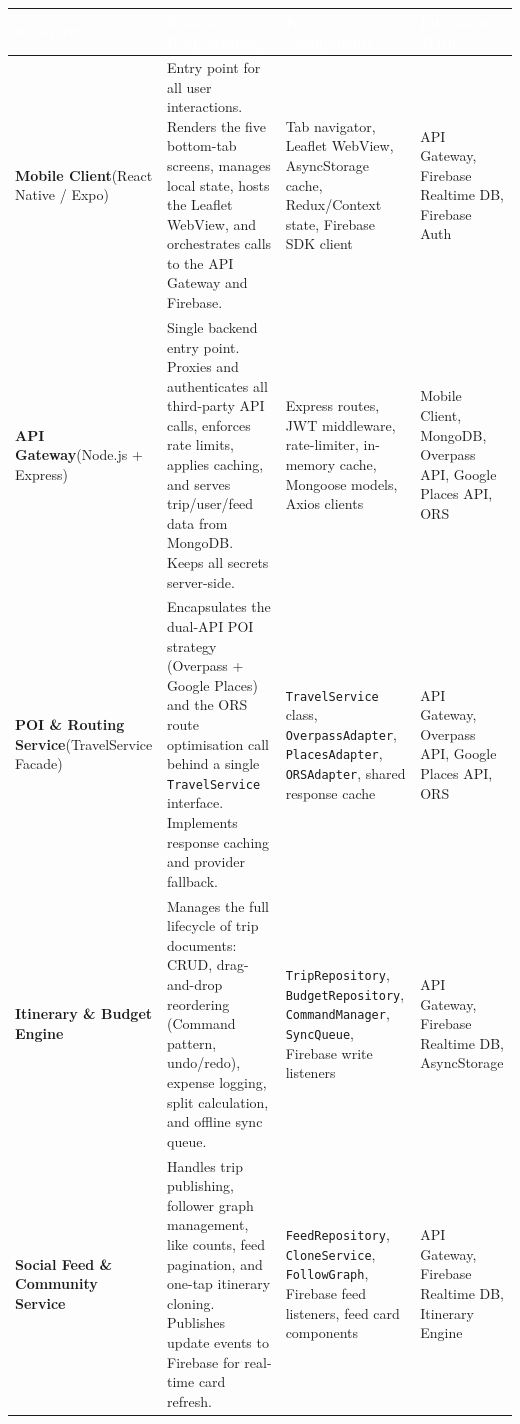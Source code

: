 \documentclass[12pt, a4paper]{article}
\newcommand{\thcell}[1]{\textcolor{white}{\textbf{\small #1}}}
\begin{document}
\begin{longtable}{L{3.0cm} L{4.8cm} L{3.8cm} L{2.2cm}}
\toprule
{}
\thcell{Subsystem} & \thcell{Role \& Responsibility} &
\thcell{Key Components} & \thcell{Interfaces With} \\
\midrule
\endhead
\bottomrule
\endfoot

\textbf{Mobile Client}\newline(React Native / Expo) &
Entry point for all user interactions. Renders the five bottom-tab screens, manages local state, hosts the Leaflet WebView, and orchestrates calls to the API Gateway and Firebase. &
Tab navigator, Leaflet WebView, AsyncStorage cache, Redux/Context state, Firebase SDK client &
API Gateway, Firebase Realtime DB, Firebase Auth \\

\textbf{API Gateway}\newline(Node.js + Express) &
Single backend entry point. Proxies and authenticates all third-party API calls, enforces rate limits, applies caching, and serves trip/user/feed data from MongoDB. Keeps all secrets server-side. &
Express routes, JWT middleware, rate-limiter, in-memory cache, Mongoose models, Axios clients &
Mobile Client, MongoDB, Overpass API, Google Places API, ORS \\

\textbf{POI \& Routing Service}\newline(TravelService Facade) &
Encapsulates the dual-API POI strategy (Overpass + Google Places) and the ORS route optimisation call behind a single \texttt{TravelService} interface. Implements response caching and provider fallback. &
\texttt{TravelService} class, \texttt{OverpassAdapter}, \texttt{PlacesAdapter}, \texttt{ORSAdapter}, shared response cache &
API Gateway, Overpass API, Google Places API, ORS \\

\textbf{Itinerary \& Budget Engine} &
Manages the full lifecycle of trip documents: CRUD, drag-and-drop reordering (Command pattern, undo/redo), expense logging, split calculation, and offline sync queue. &
\texttt{TripRepository}, \texttt{BudgetRepository}, \texttt{CommandManager}, \texttt{SyncQueue}, Firebase write listeners &
API Gateway, Firebase Realtime DB, AsyncStorage \\

\textbf{Social Feed \& Community Service} &
Handles trip publishing, follower graph management, like counts, feed pagination, and one-tap itinerary cloning. Publishes update events to Firebase for real-time card refresh. &
\texttt{FeedRepository}, \texttt{CloneService}, \texttt{FollowGraph}, Firebase feed listeners, feed card components &
API Gateway, Firebase Realtime DB, Itinerary Engine \\


\end{longtable}
\end{document}
